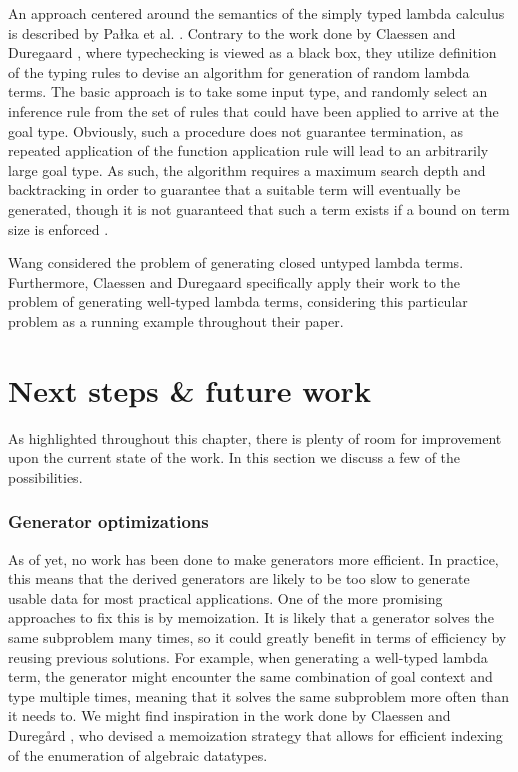 \documentclass[a4paper,msc,twosized=semi]{uustthesis}
\begin{document}
  An approach centered around the semantics of the simply typed lambda 
  calculus is described by Pa{\l}ka et al. \cite{palka2011testing}. Contrary to the 
  work done by Claessen and Duregaard \cite{claessen2015generating}, where 
  typechecking is viewed as a black box, they utilize definition of the typing rules 
  to devise an algorithm for generation of random lambda terms. The basic approach is 
  to take some input type, and randomly select an inference rule from the set of rules 
  that could have been applied to arrive at the goal type. Obviously, such a procedure 
  does not guarantee termination, as repeated application of the function application 
  rule will lead to an arbitrarily large goal type. As such, the algorithm requires a 
  maximum search depth and backtracking in order to guarantee that a suitable term 
  will eventually be generated, though it is not guaranteed that such a term exists if 
  a bound on term size is enforced \cite{moczurad2000statistical}. 

  Wang \cite{wang2005generating} considered the problem of generating closed untyped 
  lambda terms. Furthermore, Claessen and Duregaard \cite{claessen2015generating} 
  specifically apply their work to the problem of generating well-typed lambda terms, 
  considering this particular problem as a running example throughout their paper.  

\section{Next steps \& future work}

  As highlighted throughout this chapter, there is plenty of room for improvement upon 
  the current state of the work. In this section we discuss a few of the possibilities. 

\subsubsection{Generator optimizations}

  As of yet, no work has been done to make generators more efficient. In practice, 
  this means that the derived generators are likely to be too slow to generate usable 
  data for most practical applications. One of the more promising approaches to fix 
  this is by memoization. It is likely that a generator solves the same subproblem 
  many times, so it could greatly benefit in terms of efficiency by reusing previous 
  solutions. For example, when generating a well-typed lambda term, the generator 
  might encounter the same combination of goal context and type multiple times, 
  meaning that it solves the same subproblem more often than it needs to. We might 
  find inspiration in the work done by Claessen and Dureg{\aa}rd \cite
  {duregaard2013feat}, who devised a memoization strategy that allows for efficient 
  indexing of the enumeration of algebraic datatypes. 
\end{document}
